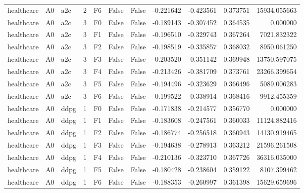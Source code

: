 \begin{tabular}{lllrlllrrrr}
healthcare &      A0 &       a2c &     2 &  F6 &           False &            False & -0.221642 & -0.423561 & 0.373751 &     15934.055663 \\
healthcare &      A0 &       a2c &     3 &  F0 &           False &            False & -0.189143 & -0.307452 & 0.364535 &         0.000000 \\
healthcare &      A0 &       a2c &     3 &  F1 &           False &            False & -0.196510 & -0.329743 & 0.367264 &      7021.832322 \\
healthcare &      A0 &       a2c &     3 &  F2 &           False &            False & -0.198519 & -0.335857 & 0.368032 &      8950.061250 \\
healthcare &      A0 &       a2c &     3 &  F3 &           False &            False & -0.203520 & -0.351142 & 0.369948 &     13750.597075 \\
healthcare &      A0 &       a2c &     3 &  F4 &           False &            False & -0.213426 & -0.381709 & 0.373761 &     23266.399654 \\
healthcare &      A0 &       a2c &     3 &  F5 &           False &            False & -0.194496 & -0.323629 & 0.366496 &      5089.006283 \\
healthcare &      A0 &       a2c &     3 &  F6 &           False &            False & -0.199522 & -0.338914 & 0.368416 &      9912.455359 \\
healthcare &      A0 &      ddpg &     1 &  F0 &           False &            False & -0.171838 & -0.214577 & 0.356770 &         0.000000 \\
healthcare &      A0 &      ddpg &     1 &  F1 &           False &            False & -0.183608 & -0.247561 & 0.360033 &     11124.882416 \\
healthcare &      A0 &      ddpg &     1 &  F2 &           False &            False & -0.186774 & -0.256518 & 0.360943 &     14130.919465 \\
healthcare &      A0 &      ddpg &     1 &  F3 &           False &            False & -0.194638 & -0.278913 & 0.363212 &     21596.261508 \\
healthcare &      A0 &      ddpg &     1 &  F4 &           False &            False & -0.210136 & -0.323710 & 0.367726 &     36316.035000 \\
healthcare &      A0 &      ddpg &     1 &  F5 &           False &            False & -0.180428 & -0.238604 & 0.359122 &      8107.399462 \\
healthcare &      A0 &      ddpg &     1 &  F6 &           False &            False & -0.188353 & -0.260997 & 0.361398 &     15629.659696 \\

\end{tabular}
